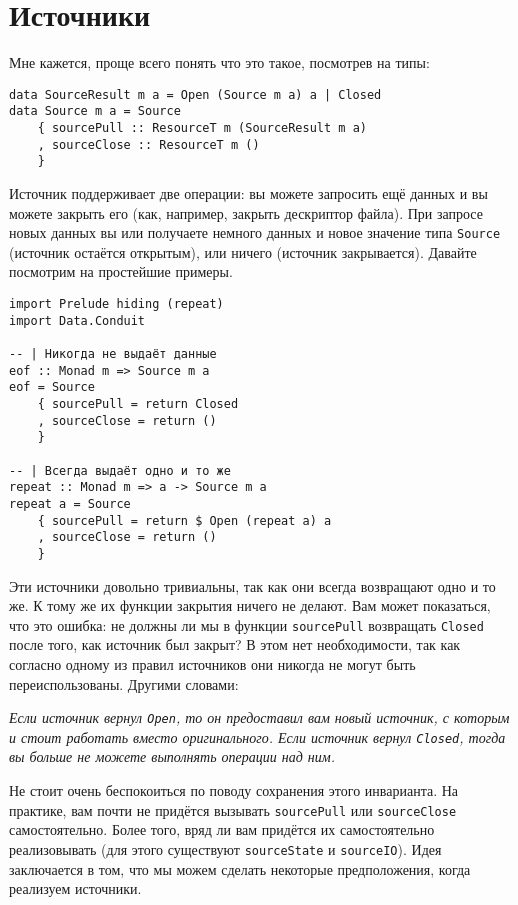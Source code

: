 \section{Источники}

Мне кажется, проще всего понять что это такое, посмотрев на типы:
\begin{lstlisting}
data SourceResult m a = Open (Source m a) a | Closed
data Source m a = Source
    { sourcePull :: ResourceT m (SourceResult m a)
    , sourceClose :: ResourceT m ()
    }
\end{lstlisting}
Источник поддерживает две операции: вы можете запросить ещё данных и вы можете закрыть его (как,
например, закрыть дескриптор файла). При запросе новых данных вы или получаете немного
данных и новое значение типа \lstinline=Source= (источник остаётся открытым), или
ничего (источник закрывается). Давайте посмотрим на простейшие примеры.
\begin{lstlisting}
import Prelude hiding (repeat)
import Data.Conduit

-- | Никогда не выдаёт данные
eof :: Monad m => Source m a
eof = Source
    { sourcePull = return Closed
    , sourceClose = return ()
    }

-- | Всегда выдаёт одно и то же
repeat :: Monad m => a -> Source m a
repeat a = Source
    { sourcePull = return $ Open (repeat a) a
    , sourceClose = return ()
    }
\end{lstlisting}
Эти источники довольно тривиальны, так как они всегда возвращают одно и то же. К тому
же их функции закрытия ничего не делают. Вам может показаться, что это ошибка: не должны ли
мы в функции \lstinline=sourcePull= возвращать \lstinline=Closed= после того, как
источник был
закрыт? В этом нет необходимости, так как согласно одному из правил
источников они никогда не могут быть переиспользованы. Другими словами:

\textit{Если источник вернул \lstinline=Open=, то он предоставил вам новый источник, с
которым и
стоит работать вместо оригинального. Если источник вернул \lstinline=Closed=, тогда вы
больше не можете выполнять операции над ним.}

Не стоит очень беспокоиться по поводу сохранения этого инварианта. На практике, вам почти
не придётся вызывать \lstinline=sourcePull= или \lstinline=sourceClose= самостоятельно.
Более того, вряд ли вам придётся их самостоятельно реализовывать (для этого существуют
\lstinline=sourceState= и \lstinline=sourceIO=).
Идея заключается в том, что мы можем сделать некоторые предположения, когда реализуем
источники.

